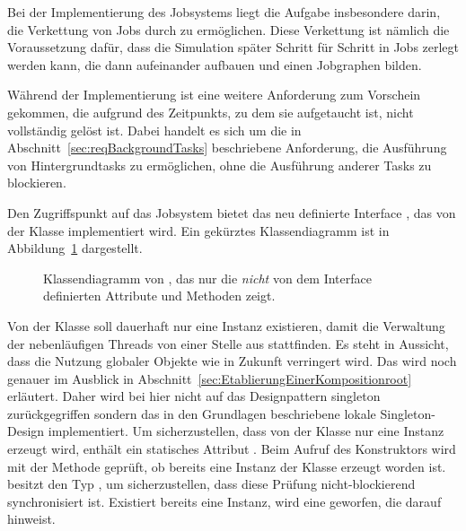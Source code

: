 Bei der Implementierung des Jobsystems liegt die Aufgabe insbesondere darin, die Verkettung von Jobs durch  zu ermöglichen. Diese Verkettung ist nämlich die Voraussetzung dafür, dass die Simulation später Schritt für Schritt in Jobs zerlegt werden kann, die dann aufeinander aufbauen und einen Jobgraphen bilden. 

Während der Implementierung ist eine weitere Anforderung zum Vorschein gekommen, die aufgrund des Zeitpunkts, zu dem sie aufgetaucht ist, nicht vollständig gelöst ist. Dabei handelt es sich um die in Abschnitt~\ref{sec:reqBackgroundTasks} beschriebene Anforderung, die Ausführung von Hintergrundtasks zu ermöglichen, ohne die Ausführung anderer Tasks zu blockieren. 

Den Zugriffspunkt auf das Jobsystem bietet das neu definierte Interface , das von der Klasse  implementiert wird. Ein gekürztes Klassendiagramm ist in Abbildung~\ref{fig:diag-BlocklibExecutor} dargestellt.

\begin{figure}[!htb]
	\centering
	
	\caption[Gekürztes Klassendiagramm von .]{Klassendiagramm von , das nur die \emph{nicht} von dem Interface  definierten Attribute und Methoden zeigt.}\label{fig:diag-BlocklibExecutor}
\end{figure}

Von der Klasse  soll dauerhaft nur eine Instanz existieren, damit die Verwaltung der nebenläufigen Threads von einer Stelle aus stattfinden. Es steht in Aussicht, dass die Nutzung globaler Objekte wie  in Zukunft verringert wird. Das wird noch genauer im Ausblick in Abschnitt~\ref{sec:EtablierungEinerKompositionroot} erläutert. Daher wird bei hier nicht auf das Designpattern \gls{singleton} zurückgegriffen sondern das in den Grundlagen beschriebene lokale Singleton-Design implementiert. Um sicherzustellen, dass von der Klasse nur eine Instanz erzeugt wird, enthält  ein statisches Attribut . Beim Aufruf des Konstruktors wird mit der Methode  geprüft, ob bereits eine Instanz der Klasse erzeugt worden ist.  besitzt den Typ , um sicherzustellen, dass diese Prüfung nicht-blockierend synchronisiert ist. Existiert bereits eine Instanz, wird eine  geworfen, die darauf hinweist.

